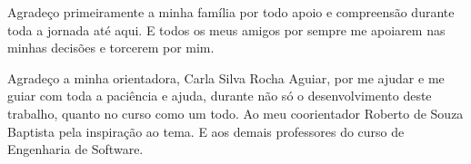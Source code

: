 \begin{agradecimentos}
  Agradeço primeiramente a minha família por todo apoio e compreensão durante toda a jornada até aqui. E todos
os meus amigos por sempre me  apoiarem nas minhas decisões e torcerem por mim.

  Agradeço a minha orientadora, Carla Silva Rocha Aguiar, por me ajudar e me guiar
 com toda a paciência e ajuda, durante não só o desenvolvimento deste trabalho, quanto no
curso como um todo. Ao meu coorientador Roberto de Souza Baptista pela inspiração ao tema. E aos demais professores do
curso de Engenharia de Software.

\end{agradecimentos}

